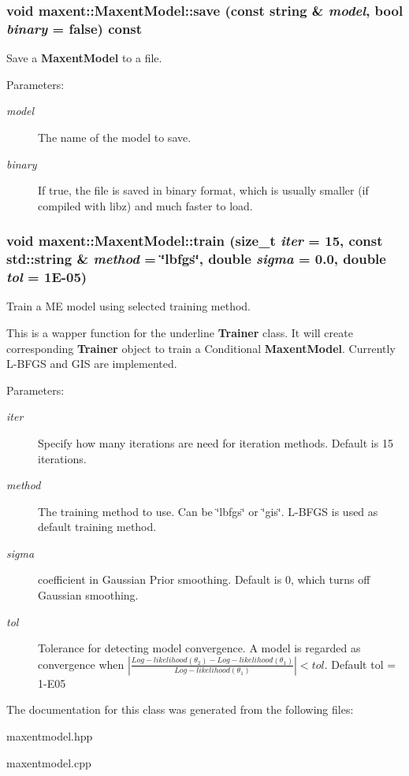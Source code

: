 \subsubsection{\setlength{\rightskip}{0pt plus 5cm}void maxent::Maxent\-Model::save (const string \& {\em model}, bool {\em binary} = false) const}\label{classmaxent_1_1MaxentModel_a2}


Save a {\bf Maxent\-Model} to a file. 

\begin{Desc}
\item[Parameters:]
\begin{description}
\item[{\em model}]The name of the model to save. \item[{\em binary}]If true, the file is saved in binary format, which is usually smaller (if compiled with libz) and much faster to load. \end{description}
\end{Desc}
\subsubsection{\setlength{\rightskip}{0pt plus 5cm}void maxent::Maxent\-Model::train (size\_\-t {\em iter} = 15, const std::string \& {\em method} = \char`\"{}lbfgs\char`\"{}, double {\em sigma} = 0.0, double {\em tol} = 1E-05)}\label{classmaxent_1_1MaxentModel_a16}


Train a ME model using selected training method. 

This is a wapper function for the underline {\bf Trainer} class. It will create corresponding {\bf Trainer} object to train a Conditional {\bf Maxent\-Model}. Currently L-BFGS and GIS are implemented.

\begin{Desc}
\item[Parameters:]
\begin{description}
\item[{\em iter}]Specify how many iterations are need for iteration methods. Default is 15 iterations.\item[{\em method}]The training method to use. Can be \char`\"{}lbfgs\char`\"{} or \char`\"{}gis\char`\"{}. L-BFGS is used as default training method.\item[{\em sigma}]coefficient in Gaussian Prior smoothing. Default is 0, which turns off Gaussian smoothing.\item[{\em tol}]Tolerance for detecting model convergence. A model is regarded as convergence when $|\frac{Log-likelihood(\theta_2) - Log-likelihood(\theta_1)}{Log-likelihood(\theta_1)}|<tol$. Default tol = 1-E05 \end{description}
\end{Desc}


The documentation for this class was generated from the following files:\begin{CompactItemize}
\item 
maxentmodel.hpp\item 
maxentmodel.cpp\end{CompactItemize}
